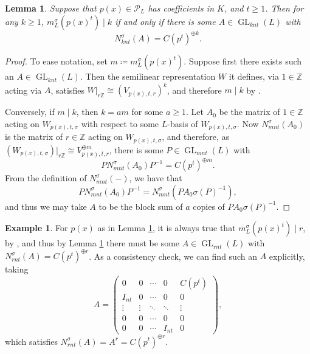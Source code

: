 \documentclass[10pt, reqno, hidelinks]{amsart}
\DeclareMathOperator{\GL}{GL}
\newcommand{\bZ}{{\mathbb Z}}
\newcommand{\sP}{{\mathcal P}}
\numberwithin{thm}{subsection}
\newtheorem{lemma}[thm]{Lemma}
\theoremstyle{definition}
\newtheorem{eg}[thm]{Example}
\begin{document}
\begin{lemma}\label{lem:mdivkmatrixform}
    Suppose that $p(x) \in \sP_L$ has coefficients in $K$, and $t \geq 1$. Then for any $k \geq 1$, $m_L^{\sigma}(p(x)^t) \mid k$ if and only if there is some $A \in \GL_{knt}(L)$ with 
    \[
    N_{knt}^{\sigma}(A) = C(p^t)^{\oplus k}.
    \]
\end{lemma}

\begin{proof}
    To ease notation, set $m \coloneqq m_L^{\sigma}(p(x)^t)$. Suppose first there exists such an $A \in \GL_{knt}(L)$. Then the semilinear representation $W$ it defines, via $1 \in \bZ$ acting via $A$, satisfies $W|_{r\bZ} \cong (V_{p(x),t,r})^k$, and therefore $m \mid k$ by \cite[Prop.\ 9.3(4)]{TAYSchur}.
    
    Conversely, if $m \mid k$, then $k = a m$ for some $a \geq 1$. Let $A_0$ be the matrix of $1 \in \bZ$ acting on $W_{p(x),t, \sigma}$ with respect to some $L$-basis of $W_{p(x),t,\sigma}$. Now $N^{\sigma}_{mnt}(A_0)$ is the matrix of $r \in \bZ$ acting on $W_{p(x),t,\sigma}$, and therefore, as $(W_{p(x),t, \sigma})|_{r \bZ} \cong V_{p(x),t,r}^{\oplus m}$, there is some $P \in \GL_{mnt}(L)$ with 
    \[
    P N^{\sigma}_{mnt}(A_0) P^{-1} = C(p^t)^{\oplus m}.
    \]
    From the definition of $N^{\sigma}_{mnt}(-)$, we have that
    \[
        P N^{\sigma}_{mnt}(A_0) P^{-1} = N^{\sigma}_{mnt}(PA_0\sigma(P)^{-1}),
    \]
    and thus we may take $A$ to be the block sum of $a$ copies of $PA_0\sigma(P)^{-1}$.
\end{proof}

\begin{eg}
    For $p(x)$ as in Lemma \ref{lem:mdivkmatrixform}, it is always true that $m_L^{\sigma}(p(x)^t) \mid r$, by \cite[Prop.\ 9.3(6)]{TAYSchur}, and thus by Lemma \ref{lem:mdivkmatrixform} there must be some $A \in \GL_{rnt}(L)$ with $N_{rnt}^{\sigma}(A) = C(p^t)^{\oplus r}$. As a consistency check, we can find such an $A$ explicitly, taking
    \[
    A = \begin{pmatrix}
    0 & 0 &\cdots & 0 & C(p^t) \\
    I_{nt} & 0 & \cdots & 0 & 0 \\
    \vdots & \vdots & \ddots & \ddots & \vdots \\
    0 & 0 & \cdots & 0 & 0 \\
    0 & 0 & \cdots & I_{nt} & 0
\end{pmatrix},
\]
which satisfies $N_{rnt}^{\sigma}(A) = A^r = C(p^t)^{\oplus r}$.
\end{eg}
\end{document}
